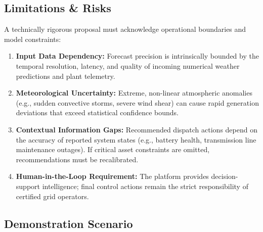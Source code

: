 \subsection{Limitations \& Risks}
\label{subsec:limitations_risks}

A technically rigorous proposal must acknowledge operational boundaries and model constraints:
\begin{enumerate}[leftmargin=1.8em, itemsep=0.25em]
    \item \textbf{Input Data Dependency:} Forecast precision is intrinsically bounded by the temporal resolution, latency, and quality of incoming numerical weather predictions and plant telemetry.
    \item \textbf{Meteorological Uncertainty:} Extreme, non-linear atmospheric anomalies (e.g., sudden convective storms, severe wind shear) can cause rapid generation deviations that exceed statistical confidence bounds.
    \item \textbf{Contextual Information Gaps:} Recommended dispatch actions depend on the accuracy of reported system states (e.g., battery health, transmission line maintenance outages). If critical asset constraints are omitted, recommendations must be recalibrated.
    \item \textbf{Human-in-the-Loop Requirement:} The platform provides decision-support intelligence; final control actions remain the strict responsibility of certified grid operators.
\end{enumerate}

\subsection{Demonstration Scenario}
\label{subsec:demonstration_scenario}

